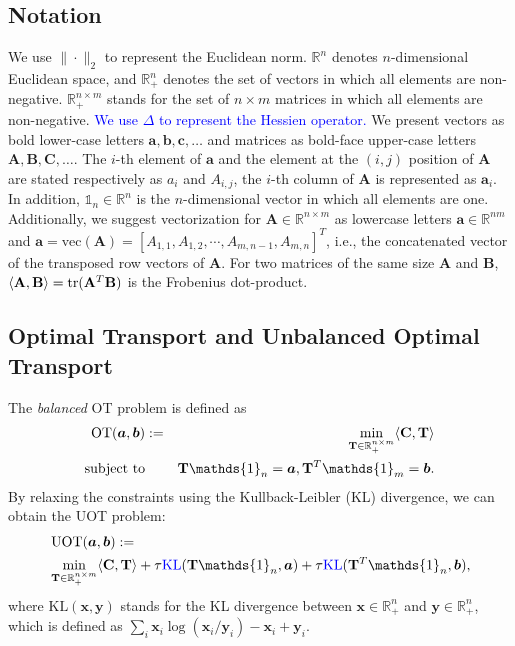 \documentclass[conference]{IEEEtran}
\newcommand{\R}{\mathbb{R}}
\newcommand{\one}{\mathds{1}}
\newcommand{\mat}[1]{\mathbf{#1}}
\renewcommand{\vec}[1]{\bm{#1}}
\newcommand{\changeSX}[1]{\textcolor{blue}{#1}}
\begin{document}
\subsection{Notation}
We use $\| \cdot \|_2$ to represent the Euclidean norm. $\mathbb{R}^n$ denotes $n$-dimensional Euclidean space, and $\mathbb{R}^n_+$ denotes the set of vectors in which all elements are non-negative. $\mathbb{R}^{n \times m}_+$ stands for the set of $n \times m$ matrices in which all elements are non-negative. \changeSX{We use $\Delta$ to represent the Hessien operator.} We present vectors as bold lower-case letters $\vec{a},\vec{b},\vec{c},\dots$ and matrices as bold-face upper-case letters $\mat{A},\mat{B},\mat{C},\dots$. The $i$-th element of $\vec{a}$ and the element at the $(i,j)$ position of $\mat{A}$ are stated respectively as $a_i$ and ${A}_{i,j}$, the $i$-th column of $\mat{A}$ is represented as $\vec{a}_i$. In addition, $\one_n \in \mathbb{R}^n$ is the $n$-dimensional vector in which all elements are one. Additionally, we suggest vectorization for $\mat{A} \in \mathbb{R}^{n \times m}$ as lowercase letters $\vec{a} \in \mathbb{R}^{nm}$ and $\vec{a}=\text{vec}(\mat{A})=[{A}_{1,1}, {A}_{1,2}, \cdots, {A}_{m,n-1}, {A}_{m,n}]^T$, i.e., the concatenated vector of the transposed row vectors of $\mat{A}$.
For two matrices of the same size $\mat{A}$ and $\mat{B}$, $\langle \mat{A},\mat{B}\rangle={\rm tr}(\mat{A}^T\mat{B})$ is the Frobenius dot-product.

\subsection{Optimal Transport and Unbalanced Optimal Transport}
The {\it balanced} OT problem is defined as
\begin{eqnarray}
\label{Eq:Standard_OT}
\operatorname{OT}(\vec{a},\vec{b}) &:=& \min_{ \mat{T} \in \R_{+}^{n \times m}} \langle \mat{C}, \mat{T} \rangle \\
\text{subject\ to}&& \mat{T} \one_n= \vec{a}, \mat{T}^{T}\one_m = \vec{b}. \notag
\end{eqnarray}
By relaxing the constraints using the Kullback-Leibler (KL) divergence, we can obtain the UOT problem:
\begin{align}
\label{eq:uot}
&\operatorname{UOT}(\vec{a},\vec{b}) := \notag\\
&\min_{\mat{T} \in \R_{+}^{n \times m}} \langle \mat{C}, \mat{T} \rangle+ \tau \changeSX{\mathrm{KL}}(\mat{T} \one_n,\vec{a}) + \tau \changeSX{\mathrm{KL}}(\mat{T}^{T} \one_n,\vec{b}),
\end{align}
where $\mathrm{KL}(\vec{x},\vec{y})$ stands for the KL divergence between $\vec{x} \in \mathbb{R}_+^n$ and $\vec{y} \in \mathbb{R}_+^n$, which is defined as $\sum_i \vec{x}_i \log {(\vec{x}_i/\vec{y}_i)} - \vec{x}_i + \vec{y}_i$.
\end{document}
